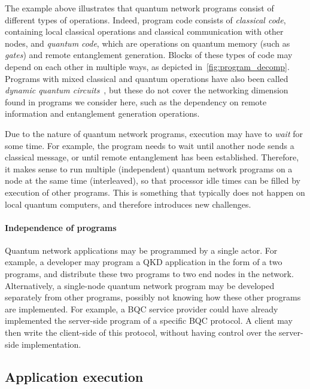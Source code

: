 The example above illustrates that quantum network programs consist of different
types of operations.
Indeed, program code consists of \textit{classical code}, containing local classical operations and classical communication with other nodes, and \textit{quantum code}, which are operations on quantum memory (such as \textit{gates}) and remote entanglement generation.
Blocks of these types of code may depend on each other in multiple ways, as depicted in~\cref{fig:program_decomp}.
Programs with mixed classical and quantum operations have also been called \textit{dynamic quantum circuits}~\cite{cross2021openqasm, burgholzer2021towards}, but these do not cover the networking dimension found in programs we consider here, such as the dependency on remote information and entanglement generation operations.

Due to the nature of quantum network programs, execution may have to \textit{wait} for some time. For example, the program needs to wait until another node sends a classical message, or until remote entanglement has been established.
Therefore, it makes sense to run multiple (independent) quantum network programs on a node at the same time (interleaved), so that processor idle times can be filled by execution of other programs. This is something that typically does not happen on local quantum computers, and therefore introduces new challenges.

\paragraph{Independence of programs}
Quantum network applications may be programmed by a single actor.
For example, a developer may program a QKD application in the form of a two programs, and distribute these two programs to two end nodes in the network.
Alternatively, a single-node quantum network program may be developed separately from other programs, possibly not knowing how these other programs are implemented.
For example, a BQC service provider could have already implemented the server-side program of a specific BQC protocol.
A client may then write the client-side of this protocol, without having control over the server-side implementation.



\subsection{Application execution}

